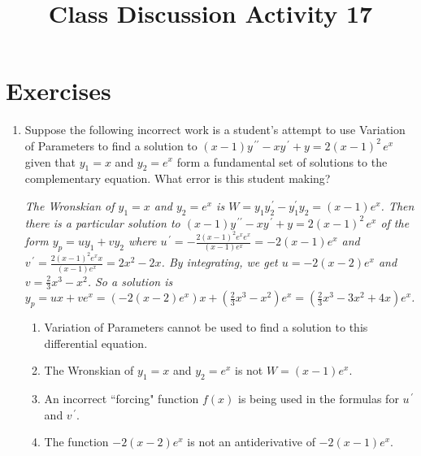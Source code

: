 \documentclass{ximera}
\begin{document}
\begin{abstract}
 \end{abstract}

    \title{Class Discussion Activity 17}
    
    \maketitle

\section*{Exercises}

\begin{enumerate}[label=(\arabic*)]

\item Suppose the following incorrect work is a student's attempt to use Variation of Parameters to find a solution to $(x-1)y^{\,\prime\prime}-xy^{\,\prime}+y=2(x-1)^2\,e^{x}$ given that $y_1=x$ and $y_2=e^x$ form a fundamental set of solutions to the complementary equation.  What error is this student making?

\emph{The Wronskian of $y_1=x$ and $y_2=e^x$ is $W=y_1y_2^{\,\prime}-y_1^{\prime}y_2=(x-1)e^x$.  Then there is a particular solution to $(x-1)y^{\,\prime\prime}-xy^{\,\prime}+y=2(x-1)^2\,e^{x}$ of the form $y_p=uy_1+vy_2$ where $\displaystyle u^{\,\prime}=-\frac{2(x-1)^2e^{x}e^x}{(x-1)e^x}=-2(x-1)e^{x}$ and \\ $\displaystyle v^{\,\prime}=\frac{2(x-1)^2e^{x}x}{(x-1)e^x}=2x^2-2x$.  By integrating, we get $u=-2(x-2)e^x$ and $\displaystyle v=\frac{2}{3}x^3-x^2$.  So a solution is \\$y_p=ux+ve^x=(-2(x-2)e^x)x+\left(\frac{2}{3}x^3-x^2\right)e^x=\left(\frac{2}{3}x^3-3x^2+4x\right)e^x$. }


\begin{enumerate}[label=(\alph*)]

\item Variation of Parameters cannot be used to find a solution to this differential equation.

\item The Wronskian of $y_1=x$ and $y_2=e^x$ is not $W=(x-1)e^x$.

\item An incorrect ``forcing" function $f(x)$ is being used in the formulas for $u^{\,\prime}$ and $v^{\,\prime}$.  %

\item The function $-2(x-2)e^x$ is not an antiderivative of $-2(x-1)e^{x}$.


\end{enumerate}
\end{enumerate}
\end{document}
